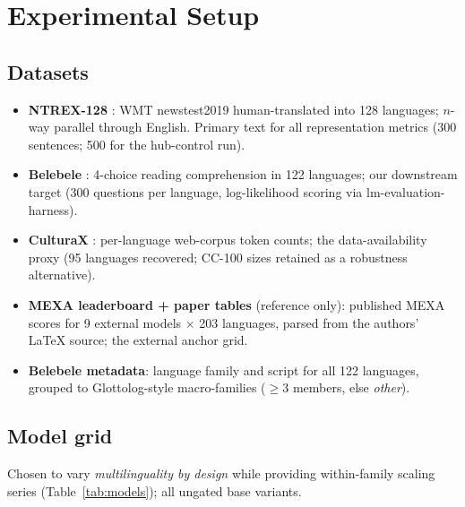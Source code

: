 \documentclass[11pt,a4paper]{article}
\begin{document}
\section{Experimental Setup}
\subsection{Datasets}
\begin{itemize}
  \item \textbf{NTREX-128} \citep{federmann2022ntrex}: WMT newstest2019
  human-translated into 128 languages; $n$-way parallel through English.
  Primary text for all representation metrics (300 sentences; 500 for the
  hub-control run).
  \item \textbf{Belebele} \citep{bandarkar2024belebele}: 4-choice reading
  comprehension in 122 languages; our downstream target (300 questions per
  language, log-likelihood scoring via lm-evaluation-harness).
  \item \textbf{CulturaX} \citep{nguyen2023culturax}: per-language web-corpus
  token counts; the data-availability proxy (95 languages recovered;
  CC-100 sizes retained as a robustness alternative).
  \item \textbf{MEXA leaderboard + paper tables} (reference only): published MEXA scores for
  9 external models $\times$ 203 languages, parsed from the authors' LaTeX
  source; the external anchor grid.
  \item \textbf{Belebele metadata}: language family and script for all 122
  languages, grouped to Glottolog-style macro-families ($\geq 3$ members,
  else \emph{other}).
\end{itemize}

\subsection{Model grid}
Chosen to vary \emph{multilinguality by design} while providing within-family
scaling series (Table~\ref{tab:models}); all ungated base variants.
\end{document}
